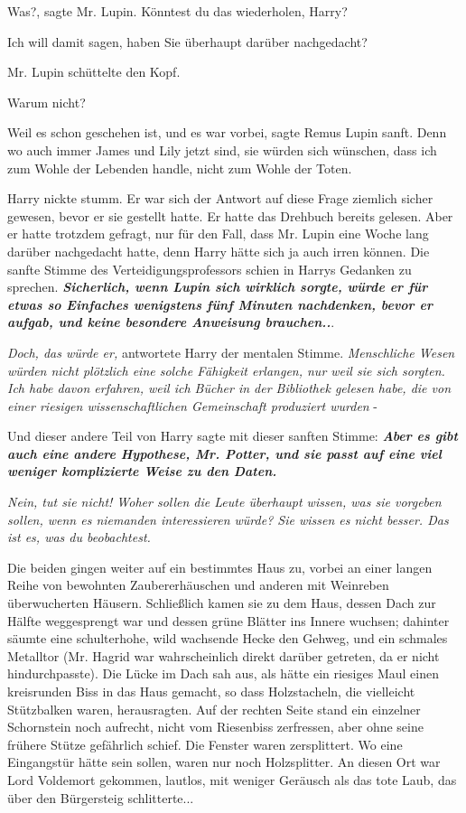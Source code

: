 \glqq{}Was?\grqq{}, sagte Mr. Lupin. \glqq{}Könntest du das wiederholen,
Harry?\grqq{}

\glqq{}Ich will damit sagen, haben Sie überhaupt darüber nachgedacht?\grqq{}

Mr. Lupin schüttelte den Kopf.

\glqq{}Warum nicht?\grqq{}

\glqq{}Weil es schon geschehen ist, und es war vorbei\grqq{}, sagte Remus Lupin
sanft. \glqq{}Denn wo auch immer James und Lily jetzt sind, sie würden sich
wünschen, dass ich zum Wohle der Lebenden handle, nicht zum Wohle der
Toten.\grqq{}

Harry nickte stumm. Er war sich der Antwort auf diese Frage ziemlich sicher
gewesen, bevor er sie gestellt hatte. Er hatte das Drehbuch bereits gelesen.
Aber er hatte trotzdem gefragt, nur für den Fall, dass Mr. Lupin eine Woche lang
darüber nachgedacht hatte, denn Harry hätte sich ja auch irren können. Die
sanfte Stimme des Verteidigungsprofessors schien in Harrys Gedanken zu sprechen.
\textbf{\emph{Sicherlich, wenn Lupin sich wirklich sorgte, würde er für etwas so
Einfaches wenigstens fünf Minuten nachdenken, bevor er aufgab, und keine
besondere Anweisung brauchen..}}.

\emph{Doch, das würde er,} antwortete Harry der mentalen Stimme.
\emph{Menschliche Wesen würden nicht plötzlich eine solche Fähigkeit erlangen,
nur weil sie sich sorgten. Ich habe davon erfahren, weil ich Bücher in der
Bibliothek gelesen habe, die von einer riesigen wissenschaftlichen Gemeinschaft
produziert wurden} -

Und dieser andere Teil von Harry sagte mit dieser sanften Stimme:
\textbf{\emph{Aber es gibt auch eine andere Hypothese, Mr. Potter, und sie passt
auf eine viel weniger komplizierte Weise zu den Daten.}}

\emph{Nein, tut sie nicht! Woher sollen die Leute überhaupt wissen, was sie
vorgeben sollen, wenn es niemanden interessieren würde? Sie wissen es nicht
besser. Das ist es, was du beobachtest.}

Die beiden gingen weiter auf ein bestimmtes Haus zu, vorbei an einer langen
Reihe von bewohnten Zaubererhäuschen und anderen mit Weinreben überwucherten
Häusern. Schließlich kamen sie zu dem Haus, dessen Dach zur Hälfte weggesprengt
war und dessen grüne Blätter ins Innere wuchsen; dahinter säumte eine
schulterhohe, wild wachsende Hecke den Gehweg, und ein schmales Metalltor (Mr.
Hagrid war wahrscheinlich direkt darüber getreten, da er nicht hindurchpasste).
Die Lücke im Dach sah aus, als hätte ein riesiges Maul einen kreisrunden Biss in
das Haus gemacht, so dass Holzstacheln, die vielleicht Stützbalken waren,
herausragten. Auf der rechten Seite stand ein einzelner Schornstein noch
aufrecht, nicht vom Riesenbiss zerfressen, aber ohne seine frühere Stütze
gefährlich schief. Die Fenster waren zersplittert. Wo eine Eingangstür hätte
sein sollen, waren nur noch Holzsplitter. An diesen Ort war Lord Voldemort
gekommen, lautlos, mit weniger Geräusch als das tote Laub, das über den
Bürgersteig schlitterte...

